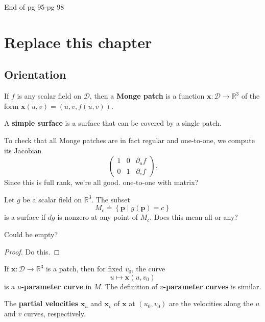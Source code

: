 \documentclass[twoside,10pt]{report}
\begin{document}
{\color{red}End of pg 95-pg 98}


\chapter{Replace this chapter}


\section{Orientation}

\begin{defn}[]
	If $f$ is any scalar field on $\mathcal{D}$, then a \textbf{Monge patch} is a function $\mathbf{x}:\mathcal{D}\to \mathbb{R}^3$ of the form $\mathbf{x}(u,v)=(u,v,f(u,v))$.

	A \textbf{simple surface} is a surface that can be covered by a single patch.
\end{defn}

To check that all Monge patches are in fact regular and one-to-one, we compute its Jacobian
\[
\begin{pmatrix}
	1 & 0 & \partial_{u}{f} \\
	0 & 1 & \partial_{v}{f} 
\end{pmatrix}.
\] Since this is full rank, we're all good. {\color{red}one-to-one with matrix?}

\begin{thrm}[]
	Let $g$ be a scalar field on $\mathbb{R}^3$. The subset \[M_c \doteq \left\{ \mathbf{p} \;|\; g(\mathbf{p})=c \right\}\] is a surface if $dg$ is nonzero at any point of $M_c$. {\color{red}Does this mean all or any?}

	{\color{red}Could be empty?}
\end{thrm}
\begin{proof}
	{\color{red}Do this.}
\end{proof}

If $\mathbf{x}:\mathcal{D}\to \mathbb{R}^3$ is a patch, then for fixed $v_0$, the curve
\[u\mapsto \mathbf{x}(u,v_0)\] is a \textbf{$u$-parameter curve} in $M$. The definition of \textbf{$v$-parameter curves} is similar.

\begin{defn}[]
	The \textbf{partial velocities} $\mathbf{x}_{u}$ and $\mathbf{x}_{v}$ of $\mathbf{x}$ at $(u_0,v_0)$ are the velocities along the $u$ and $v$ curves, respectively.
\end{defn}
\end{document}
